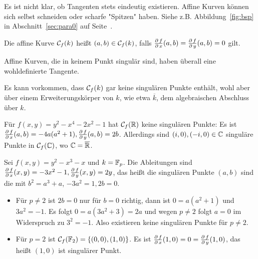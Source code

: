 \begin{bem}
	Es ist nicht klar, ob Tangenten stets eindeutig existieren. 
	Affine Kurven können sich selbst schneiden oder scharfe "Spitzen" haben. 
	Siehe z.B. Abbildung~\ref{fig:bsp} in Abschnitt~\ref{sec:para0} auf Seite~\pageref{fig:bsp}.
\end{bem}

\begin{defn}
	Die affine Kurve $\mathcal{C}_f(k)$ heißt  $(a,b) \in \mathcal{C}_f(k)$, falls $\frac{\operatorname{\partial} f}{\operatorname{\partial} x}(a,b) = \frac{\operatorname{\partial} f}{\operatorname{\partial} y}(a,b) = 0$ gilt. 
\end{defn}

\begin{bem}
	Affine Kurven, die in keinem Punkt singulär sind, haben überall eine wohldefinierte Tangente.
\end{bem}

\begin{bem}
	Es kann vorkommen, dass $\mathcal{C}_f(k)$ gar keine singulären Punkte enthält, wohl aber über einem Erweiterungskörper von $k$, wie etwa $\overline{k}$, dem algebraischen Abschluss über $k$.
\end{bem}

\begin{bsp}
	Für $f(x,y) = y^2 - x^4 - 2x^2 - 1$ hat $\mathcal{C}_f(\mathbb{R})$ keine singulären Punkte: Es ist $\frac{\der f}{\der x}(a,b) = -4a(a^2+1),\linebreak \frac{\der f}{\der y}(a,b) = 2b$. 
	Allerdings sind $(i,0),(-i,0) \in \mathbb{C}$ singuläre Punkte in $\mathcal{C}_f(\mathbb{C})$, wo $\mathbb{C} = \overline{\mathbb{R}}$.
\end{bsp}

\begin{bsp}
	Sei $f(x,y) = y^2 - x^3 - x$ und $k = \mathbb{F}_p$. 
	Die Ableitungen sind $\frac{\operatorname{\partial} f}{\operatorname{\partial} x} (x,y) = -3x^2-1, \frac{\operatorname{\partial} f}{\operatorname{\partial} y}(x,y) = 2y$, das heißt die singulären Punkte $(a,b)$ sind die mit $b^2 = a^3 + a$, $-3a^2 = 1, 2b=0$.\begin{itemize}
		\item Für $p \neq 2$ ist $2b = 0$ nur für $b = 0$ richtig, dann ist $0 = a(a^2+1)$ und $3a^2 = -1$. 
		Es folgt $0 = a(3a^2 + 3) = 2a$ und wegen $p \neq 2$ folgt $a = 0$ im Widerspruch zu $3^2=-1$. 
		Also existieren keine singulären Punkte für $p \neq 2$.
		\item Für $p = 2$ ist $\mathcal{C}_f(\mathbb{F}_2) = \{(0,0),(1,0)\}$. 
		Es ist $\frac{\operatorname{\partial} f}{\operatorname{\partial} x} (1,0) = 0 = \frac{\operatorname{\partial} f}{\operatorname{\partial} y}(1,0)$, das heißt $(1,0)$ ist singulärer Punkt.
	\end{itemize}
\end{bsp}

